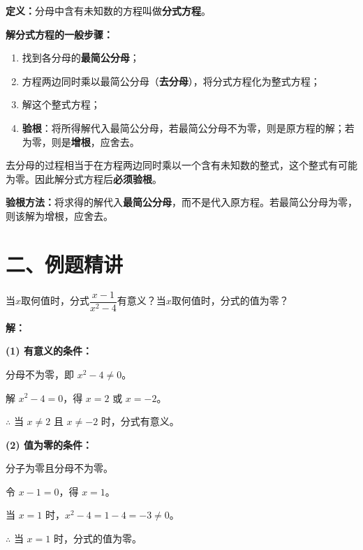 \documentclass[12pt, a4paper]{ctexart}
\begin{document}
\begin{knowledgebox}[分式方程及其解法]
\textbf{定义：}分母中含有未知数的方程叫做\textbf{分式方程}。

\medskip
\textbf{解分式方程的一般步骤：}
\begin{enumerate}[leftmargin=2em]
  \item 找到各分母的\textbf{最简公分母}；
  \item 方程两边同时乘以最简公分母（\textbf{去分母}），将分式方程化为整式方程；
  \item 解这个整式方程；
  \item \textbf{验根}：将所得解代入最简公分母，若最简公分母不为零，则是原方程的解；若为零，则是\textbf{增根}，应舍去。
\end{enumerate}
\end{knowledgebox}

\begin{warnbox}
去分母的过程相当于在方程两边同时乘以一个含有未知数的整式，这个整式有可能为零。因此解分式方程后\textbf{必须验根}。

\medskip
\textbf{验根方法：}将求得的解代入\textbf{最简公分母}，而不是代入原方程。若最简公分母为零，则该解为增根，应舍去。
\end{warnbox}

\section*{\textcolor{examorange}{二、例题精讲}}

\begin{examplebox}[【例题1】判断分式的类型及意义条件]
当$x$取何值时，分式$\dfrac{x-1}{x^2 - 4}$有意义？当$x$取何值时，分式的值为零？

\bigskip
\textbf{解：}

\textbf{(1) 有意义的条件：}

分母不为零，即 $x^2 - 4 \neq 0$。

解 $x^2 - 4 = 0$，得 $x = 2$ 或 $x = -2$。

$\therefore$ 当 $x \neq 2$ 且 $x \neq -2$ 时，分式有意义。

\medskip
\textbf{(2) 值为零的条件：}

分子为零且分母不为零。

令 $x - 1 = 0$，得 $x = 1$。

当 $x = 1$ 时，$x^2 - 4 = 1 - 4 = -3 \neq 0$。

$\therefore$ 当 $x = 1$ 时，分式的值为零。
\end{examplebox}
\end{document}
